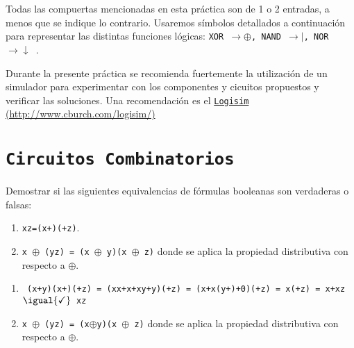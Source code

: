Todas las compuertas mencionadas en esta práctica son de 1 o 2 entradas, a menos que se indique lo contrario.
Usaremos símbolos detallados a continuación para representar las distintas funciones lógicas:
{\tt XOR $\to \oplus$, NAND $\to |$, NOR $\to \downarrow$   }.\par
Durante la presente práctica se recomienda fuertemente la utilización de un simulador para experimentar con
los componentes y cicuitos propuestos y verificar las soluciones. Una recomendación es el \href{http://www.cburch.com/logisim}{\texttt{Logisim} (http://www.cburch.com/logisim/)}\par\bigskip

\section*{\tt Circuitos Combinatorios}

\begin{enunciado}{\ejercicio}
  Demostrar si las siguientes equivalencias de fórmulas booleanas son verdaderas o falsas:
  \begin{enumerate}[label=\tt\alph*)]
    \item {\tt x\por z=(x+)\por (+z)}.
    \item {\tt x $\oplus$ (y\por z) = (x $\oplus$ y)\por (x $\oplus$ z)} donde se aplica la propiedad distributiva con respecto a $\oplus$.
  \end{enumerate}
\end{enunciado}

\begin{enumerate}[label=\tt\alph*)]
  \item
        {\tt
        (x+y)(x+)(+z) =
        (xx+x+xy+y)(+z) =
        (x+x(y+)+0)(+z) =
        x(+z) =
        x+xz
        $\igual{\checkmark}$
        xz
        }
  \item {\tt x $\oplus$ (y\por z) = (x$\oplus$y)\por (x $\oplus$ z)} donde se aplica la propiedad distributiva con respecto a $\oplus$.
\end{enumerate}

